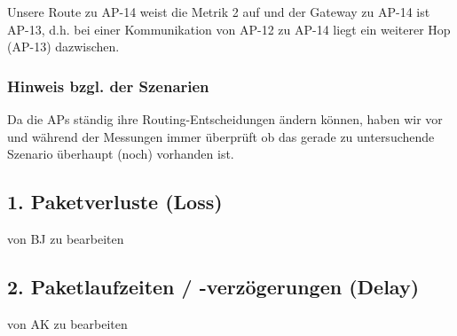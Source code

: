 \documentclass[a4paper,10pt]{article}
\begin{document}
Unsere Route zu AP-14 weist die Metrik 2 auf und der Gateway zu AP-14 ist AP-13, d.h. bei einer Kommunikation von AP-12 zu AP-14 liegt ein weiterer Hop (AP-13) dazwischen.

\subsubsection*{Hinweis bzgl. der Szenarien}

Da die APs ständig ihre Routing-Entscheidungen ändern können,
haben wir vor und während der Messungen immer überprüft ob das gerade zu untersuchende Szenario überhaupt (noch) vorhanden ist.

%
%
%
%
%
%
%
%
\subsection{1. Paketverluste (Loss)}

von BJ zu bearbeiten

%
%
%
%
%
%
%
\subsection{2. Paketlaufzeiten / -verzögerungen (Delay)}

von AK zu bearbeiten

%
%
%
%
%
%
%
%
%
%
%
\end{document}
